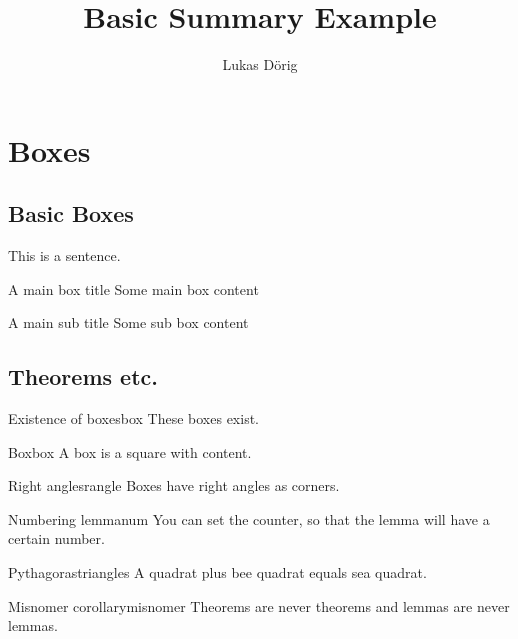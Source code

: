 \def\lutilpath{../..}



\title{Basic Summary Example}
\author{Lukas Dörig}



\maketitle

\section{Boxes}

\subsection{Basic Boxes}

This is a sentence.

\begin{mainbox}{A main box title}
  Some main box content
\end{mainbox}

\begin{subbox}{A main sub title}
  Some sub box content
\end{subbox}

\subsection{Theorems etc.}

\begin{axiom}{Existence of boxes}{box}
  These boxes exist.
\end{axiom}

\begin{definition}{Box}{box}
  A box is a square with content.
\end{definition}

\begin{corollary}{Right angles}{rangle}
  Boxes have right angles as corners.
\end{corollary}

\begin{lemma}{Numbering lemma}{num}
  You can set the counter, so that the lemma will have a certain number.
\end{lemma}

\begin{satz}{Pythagoras}{triangles}
  A quadrat plus bee quadrat equals sea quadrat.
\end{satz}

\begin{theorem}{Misnomer corollary}{misnomer}
  Theorems are never theorems and lemmas are never lemmas.
\end{theorem}


